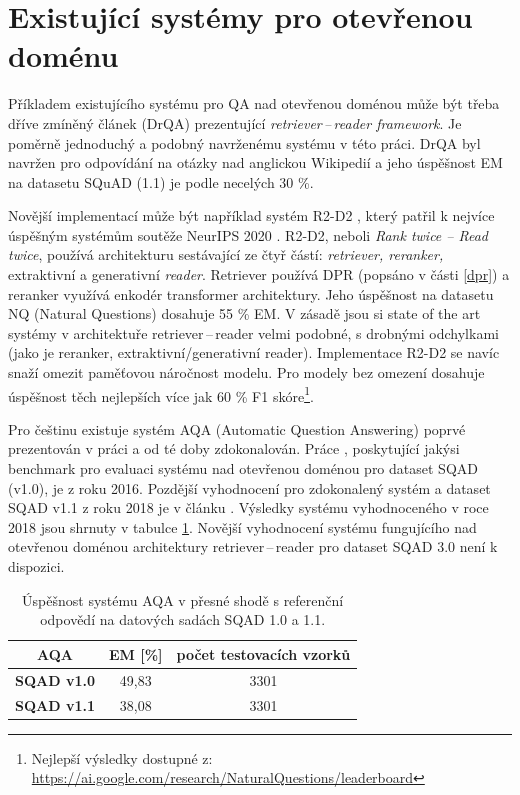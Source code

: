 \section{Existující systémy pro otevřenou doménu}
\label{existing_work}
Příkladem existujícího systému pro QA nad otevřenou doménou může být třeba dříve zmíněný článek \cite{drQA} (DrQA) prezentující \emph{retriever\,--\,reader framework}. Je poměrně jednoduchý a podobný navrženému systému v této práci. DrQA byl navržen pro odpovídání na otázky nad anglickou Wikipedií a jeho úspěšnost EM na datasetu SQuAD (1.1) je podle \cite{drQA} necelých 30 \%.\par
Novější implementací může být například systém R2-D2 \cite{fajcik2021pruning}, který patřil k nejvíce úspěšným systémům soutěže NeurIPS 2020 \cite{min2021neurips}. R2-D2, neboli \textit{Rank twice -- Read twice}, používá architekturu sestávající ze čtyř částí: \emph{retriever, reranker, }extraktivní a generativní \emph{reader}. Retriever používá DPR \cite{dpr}(popsáno v části \ref{dpr}) a reranker využívá enkodér transformer architektury. Jeho úspěšnost na datasetu NQ (Natural Questions) dosahuje 55 \% EM. V zásadě jsou si state of the art systémy v architektuře retriever\,--\,reader velmi podobné, s drobnými odchylkami (jako je reranker, extraktivní/generativní reader). Implementace \mbox{R2-D2} se navíc snaží omezit paměťovou náročnost modelu. Pro modely bez omezení dosahuje úspěšnost těch nejlepších více jak 60 \% F1 skóre\footnote{Nejlepší výsledky dostupné z: \url{https://ai.google.com/research/NaturalQuestions/leaderboard}}.\par\medskip
Pro češtinu existuje systém AQA (Automatic Question Answering) poprvé prezentován v práci \cite{aqa} a od té doby zdokonalován. Práce \cite{aqa}, poskytující jakýsi benchmark pro evaluaci systému nad otevřenou doménou pro dataset SQAD (v1.0), je z roku 2016. Pozdější vyhodnocení pro zdokonalený systém a dataset SQAD v1.1 z roku 2018 je v článku \cite{aqa2018}. Výsledky systému vyhodnoceného v roce 2018 jsou shrnuty v tabulce \ref{tab:aqa_benchmark}. Novější vyhodnocení systému fungujícího nad otevřenou doménou architektury retriever\,--\,reader pro dataset SQAD 3.0 není k dispozici.
\begin{table}[H]
\centering
    \begin{tabular}{|l|c|c|}
    \hline
    \multicolumn{1}{|c|}{{\textbf{AQA}}} & EM [\%]    & \multicolumn{1}{l|}{počet testovacích vzorků} \\ \hline
    \textbf{SQAD v1.0}                       & 49,83 & 3301                                         \\ \hline
    \textbf{SQAD v1.1}                       & 38,08 & 3301                                         \\ \hline
    \end{tabular}
\caption{Úspěšnost systému AQA v přesné shodě s referenční odpovědí na datových sadách SQAD 1.0 a 1.1.}
\label{tab:aqa_benchmark}
\end{table}

